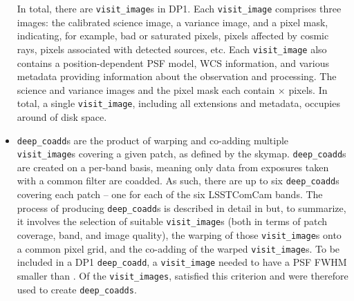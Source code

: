 \begin{itemize}
In total, there are \nvisitimages \texttt{visit\_image}s in \gls{DP1}.
Each \texttt{visit\_image}  comprises three images: the calibrated science image, a variance image, and a pixel mask, indicating, for example, bad or saturated pixels, pixels affected by cosmic rays, pixels associated with detected sources, etc.
Each \texttt{visit\_image} also contains a position-dependent \gls{PSF} model, \gls{WCS} information, and various \gls{metadata} providing information about the observation and processing.
The science and variance images and the pixel mask each contain \nvisitimagepixx$\times$ \nvisitimagepixy pixels.
In total, a single \texttt{visit\_image}, including all extensions and \gls{metadata}, occupies around \visitimagehdd of disk space.





\item \texttt{deep\_coadd}s \citep{10.71929/rubin/2570313} are the product of warping and co-adding multiple \texttt{visit\_image}s covering a given \gls{patch}, as defined by the skymap.
\texttt{deep\_coadd}s are created on a per-band basis, meaning only data from exposures taken with a common filter are coadded.
As such, there are up to six \texttt{deep\_coadd}s covering each \gls{patch} -- one for each of the six \gls{LSSTComCam} bands.
The process of producing \texttt{deep\_coadd}s is described in detail in  but, to summarize, it involves the selection of suitable \texttt{visit\_image}s (both in terms of \gls{patch} coverage, band, and image quality), the warping of those \texttt{visit\_image}s onto a common pixel grid, and the co-adding of the warped \texttt{visit\_image}s.
To be included in a \gls{DP1} \texttt{deep\_coadd}, a \texttt{visit\_image} needed to have a \gls{PSF} \gls{FWHM} smaller than \deepcoaddmaxfwhm. Of the \nvisitimages \texttt{visit\_images}, \nselectedvisitimages satisfied this criterion and were therefore used to create \texttt{deep\_coadds}.


\end{itemize}
